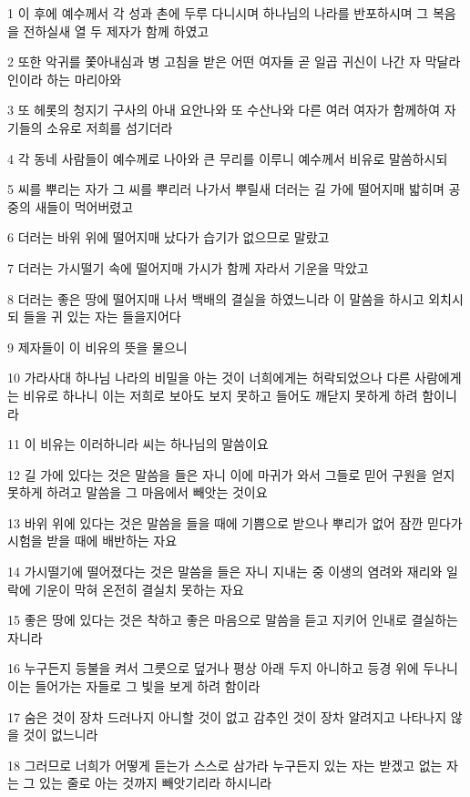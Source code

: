 \par 1 이 후에 예수께서 각 성과 촌에 두루 다니시며 하나님의 나라를 반포하시며 그 복음을 전하실새 열 두 제자가 함께 하였고
\par 2 또한 악귀를 쫓아내심과 병 고침을 받은 어떤 여자들 곧 일곱 귀신이 나간 자 막달라인이라 하는 마리아와
\par 3 또 헤롯의 청지기 구사의 아내 요안나와 또 수산나와 다른 여러 여자가 함께하여 자기들의 소유로 저희를 섬기더라
\par 4 각 동네 사람들이 예수께로 나아와 큰 무리를 이루니 예수께서 비유로 말씀하시되
\par 5 씨를 뿌리는 자가 그 씨를 뿌리러 나가서 뿌릴새 더러는 길 가에 떨어지매 밟히며 공중의 새들이 먹어버렸고
\par 6 더러는 바위 위에 떨어지매 났다가 습기가 없으므로 말랐고
\par 7 더러는 가시떨기 속에 떨어지매 가시가 함께 자라서 기운을 막았고
\par 8 더러는 좋은 땅에 떨어지매 나서 백배의 결실을 하였느니라 이 말씀을 하시고 외치시되 들을 귀 있는 자는 들을지어다
\par 9 제자들이 이 비유의 뜻을 물으니
\par 10 가라사대 하나님 나라의 비밀을 아는 것이 너희에게는 허락되었으나 다른 사람에게는 비유로 하나니 이는 저희로 보아도 보지 못하고 들어도 깨닫지 못하게 하려 함이니라
\par 11 이 비유는 이러하니라 씨는 하나님의 말씀이요
\par 12 길 가에 있다는 것은 말씀을 들은 자니 이에 마귀가 와서 그들로 믿어 구원을 얻지 못하게 하려고 말씀을 그 마음에서 빼앗는 것이요
\par 13 바위 위에 있다는 것은 말씀을 들을 때에 기쁨으로 받으나 뿌리가 없어 잠깐 믿다가 시험을 받을 때에 배반하는 자요
\par 14 가시떨기에 떨어졌다는 것은 말씀을 들은 자니 지내는 중 이생의 염려와 재리와 일락에 기운이 막혀 온전히 결실치 못하는 자요
\par 15 좋은 땅에 있다는 것은 착하고 좋은 마음으로 말씀을 듣고 지키어 인내로 결실하는 자니라
\par 16 누구든지 등불을 켜서 그릇으로 덮거나 평상 아래 두지 아니하고 등경 위에 두나니 이는 들어가는 자들로 그 빛을 보게 하려 함이라
\par 17 숨은 것이 장차 드러나지 아니할 것이 없고 감추인 것이 장차 알려지고 나타나지 않을 것이 없느니라
\par 18 그러므로 너희가 어떻게 듣는가 스스로 삼가라 누구든지 있는 자는 받겠고 없는 자는 그 있는 줄로 아는 것까지 빼앗기리라 하시니라
